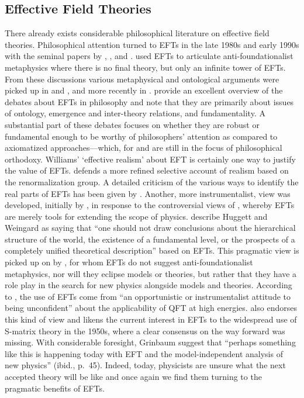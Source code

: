 \subsection{Effective Field Theories}\label{PhilEFT}

There already exists considerable philosophical literature on effective field theories.
Philosophical attention turned to EFTs in the late 1980s and early 1990s with the seminal papers by \citet{teller89}, \citet{cao1993}, and \citet{huggetweingard}. 
\citet{cao1993} used EFTs to articulate anti-foundationalist metaphysics where there is no final theory, but only an infinite tower of EFTs. 
From these discussions various metaphysical and ontological arguments were picked up in \citet{castellani2002} and \citet{fraser2009}, and more recently in \citep{bain2013a,Crowther2016-CROESU,Rivat2020-RIVPFO,Ruetsche2018,williams2018}. 
\citet{Rivat2020-RIVPFO} provide an excellent overview of the debates about EFTs in philosophy and note that they are primarily about issues of ontology, emergence and inter-theory relations, and fundamentality. 
A substantial part of these debates focuses on whether they are robust or fundamental enough to be worthy of philosophers' attention as compared to axiomatized approaches---which, for \citet{wallace2006} and \citet{williams2018} are still in the focus of philosophical orthodoxy. 
Williams' `effective realism' about EFT is certainly one way to justify the value of EFTs. 
\citet{fraserj2020} defends a more refined selective account of realism based on  the renormalization group. 
A detailed criticism of the various ways to identify the real parts of EFTs has been given by \citep{rivat2020a}.
Another, more instrumentalist, view was developed, initially by \citet{huggetweingard}, in response to the controversial views of \citet{cao1993}, whereby EFTs are merely tools for extending the scope of physics. 
\citet{Rivat2020-RIVPFO} describe Huggett and Weingard as saying that 
``one should not draw conclusions about the hierarchical structure of the world, the existence of a fundamental level, or the prospects of a completely unified theoretical description'' based on EFTs.
This pragmatic view is picked up on by \citet{hartmann2001}, for whom EFTs do not suggest anti-foundationalist metaphysics, nor will they eclipse models or theories, but rather that they have a role play in the search for new physics alongside models and theories.
According to \citet{Butterfield_2010}, the use of EFTs come from ``an opportunistic or instrumentalist attitude to being unconfident'' about the applicability of QFT at high energies.
\citet{Grinbaum2008-GRIOTE} also endorses this kind of view and likens the current interest in EFTs to the widespread use of S-matrix theory in the 1950s, where a clear consensus on the way forward was missing. 
With considerable foresight, Grinbaum suggest that ``perhaps something like this is happening today with EFT and the model-independent analysis of new physics'' (ibid., p.~45).
Indeed, today, physicists are unsure what the next accepted theory will be like and once again we find them turning to the pragmatic benefits of EFTs.

